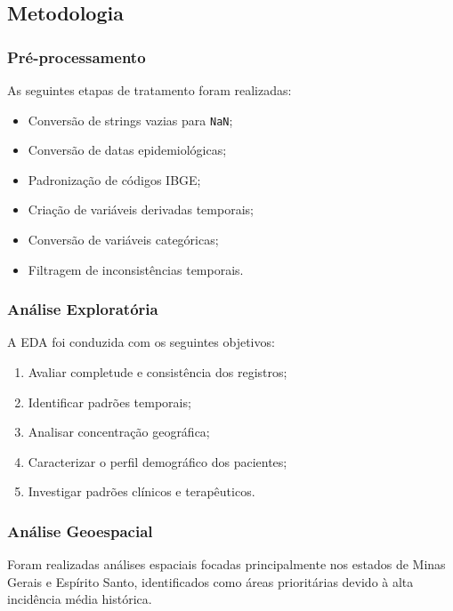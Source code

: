 \documentclass[12pt]{article}
\begin{document}
\subsection{Metodologia}

\subsubsection{Pré-processamento}

As seguintes etapas de tratamento foram realizadas:

\begin{itemize}
    \item Conversão de strings vazias para \texttt{NaN};
    \item Conversão de datas epidemiológicas;
    \item Padronização de códigos IBGE;
    \item Criação de variáveis derivadas temporais;
    \item Conversão de variáveis categóricas;
    \item Filtragem de inconsistências temporais.
\end{itemize}

\subsubsection{Análise Exploratória}

A EDA foi conduzida com os seguintes objetivos:

\begin{enumerate}
    \item Avaliar completude e consistência dos registros;
    \item Identificar padrões temporais;
    \item Analisar concentração geográfica;
    \item Caracterizar o perfil demográfico dos pacientes;
    \item Investigar padrões clínicos e terapêuticos.
\end{enumerate}

\subsubsection{Análise Geoespacial}

Foram realizadas análises espaciais focadas principalmente nos estados de Minas Gerais
e Espírito Santo, identificados como áreas prioritárias devido à alta incidência média
histórica.
\end{document}
